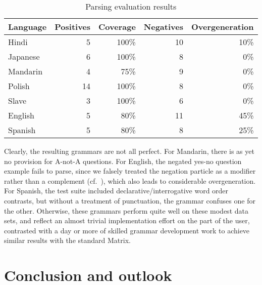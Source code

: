 \begin{table*}[ht]
\begin{center}
\small
\begin{tabular}{lrrrr}
\hline
Language & Positives & Coverage & Negatives & Overgeneration \\ \hline
Hindi    & 5         & 100\% 	& 10 & 10\% \\
Japanese & 6         & 100\%    &  8 & 0\% \\
Mandarin & 4	     &  75\%	&  9 & 0\% \\
Polish   & 14	     & 100\%    &  8 & 0\% \\
Slave    & 3         & 100\%	&  6 & 0\% \\
English  & 5	     & 80\%	& 11 & 45\%\\
Spanish  & 5         & 80\%	& 8  & 25\% \\ \hline
\end{tabular}
\end{center}
\caption{Parsing evaluation results}
\label{testresults}
\end{table*}

Clearly, the resulting grammars are not all perfect.  For Mandarin,
there is as yet no provision for A-not-A questions.  For
English, the negated yes-no question example fails to
parse, since we falsely treated the negation particle as a modifier
rather than a complement (cf.\ ),
which also leads to considerable overgeneration. For Spanish, the
test suite included declarative/interrogative word order contrasts, but
without a treatment of punctuation, the grammar confuses one for the other.
Otherwise, these grammars perform quite well on these modest data sets,
and reflect an almost trivial implementation effort on the part of the user,
contrasted with a day or more of skilled grammar development work to 
achieve similar results with the standard Matrix.

\section{Conclusion and outlook}

